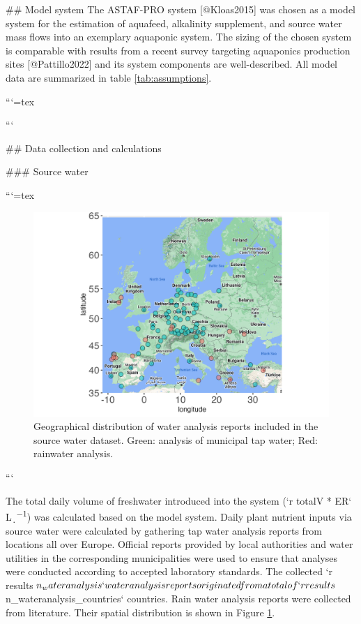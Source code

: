 ## Model system
The ASTAF-PRO system [@Kloas2015] was chosen as a model system for the estimation of aquafeed, alkalinity supplement, and source water mass flows into an exemplary aquaponic system. The sizing of the chosen system is comparable with results from a recent survey targeting aquaponics production sites [@Pattillo2022] and its system components are well-described. All model data are summarized in table \ref{tab:assumptions}.

```{=tex}

```



## Data collection and calculations

### Source water

```{=tex}
\begin{figure}
\centering
  \includegraphics{../output/plots/map.png}
  \caption{Geographical distribution of water analysis reports included in the source water dataset. Green: analysis of municipal tap water; Red: rainwater analysis.}
  \label{fig:map_water}
\end{figure}
```

The total daily volume of freshwater introduced into the system (`r totalV * ER` \si{\L\per\d}) was calculated based on the model system. Daily plant nutrient inputs via source water were calculated by gathering tap water analysis reports from locations all over Europe. Official reports provided by local authorities and water utilities in the corresponding municipalities were used to ensure that analyses were conducted according to accepted laboratory standards. The collected `r results$n_wateranalysis` water analysis reports originated from a total of `r results$n_wateranalysis_countries` countries. 
Rain water analysis reports were collected from literature.
Their spatial distribution is shown in Figure \ref{fig:map_water}. 



